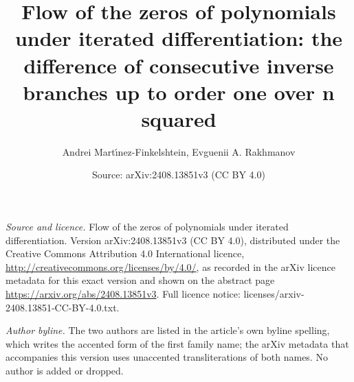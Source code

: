 \documentclass[10pt,a4paper]{amsart}
\title[Flow of the zeros of derivatives]{Flow of the zeros of polynomials under iterated differentiation: the difference of consecutive inverse branches up to order one over n squared}
\author{Andrei Mart\'{\i}nez-Finkelshtein, Evguenii A. Rakhmanov}
\date{Source: arXiv:2408.13851v3 (CC BY 4.0)}
\theoremstyle{plain}
\theoremstyle{remark}
\begin{document}
\maketitle
\noindent\emph{Source and licence.} Flow of the zeros of polynomials under iterated differentiation. Version arXiv:2408.13851v3 (CC BY 4.0), distributed under the Creative Commons Attribution 4.0 International licence, \url{http://creativecommons.org/licenses/by/4.0/}, as recorded in the arXiv licence metadata for this exact version and shown on the abstract page \url{https://arxiv.org/abs/2408.13851v3}. Full licence notice: licenses/arxiv-2408.13851-CC-BY-4.0.txt.\par\smallskip

\noindent\textit{Author byline.} The two authors are listed in the article's own byline spelling, which writes the accented form of the first family name; the arXiv metadata that accompanies this version uses unaccented transliterations of both names. No author is added or dropped.\par\smallskip
\end{document}

